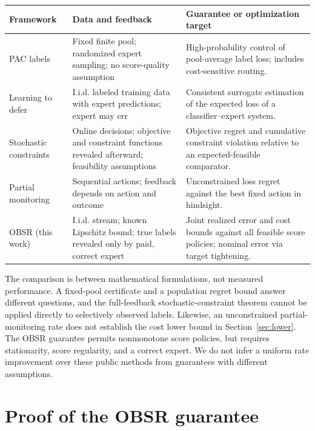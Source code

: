 \documentclass[11pt]{article}
\theoremstyle{remark}
\begin{document}
\begin{center}
\small
\setlength{\tabcolsep}{5pt}
\begin{tabular}{@{}>{\raggedright\arraybackslash}p{}
                  >{\raggedright\arraybackslash}p{}
                  >{\raggedright\arraybackslash}p{}@{}}
\toprule
Framework & Data and feedback & Guarantee or optimization target\\
\midrule
PAC labels~\cite{paclabels} & Fixed finite pool; randomized expert sampling;
no score-quality assumption & High-probability control of pool-average
label loss; includes cost-sensitive routing.\\[5pt]
Learning to defer~\cite{defer} & I.i.d. labeled training data with expert
predictions; expert may err & Consistent surrogate estimation of the
expected loss of a classifier--expert system.\\[5pt]
Stochastic constraints~\cite{stochastic} & Online decisions; objective and
constraint functions revealed afterward; feasibility assumptions &
Objective regret and cumulative constraint violation relative to an
expected-feasible comparator.\\[5pt]
Partial monitoring~\cite{partial} & Sequential actions; feedback depends
on action and outcome & Unconstrained loss regret against the best fixed
action in hindsight.\\[5pt]
OBSR (this work) & I.i.d. stream; known Lipschitz bound; true labels
revealed only by paid, correct expert & Joint realized error and cost bounds
against all feasible score policies; nominal error via target tightening.\\
\bottomrule
\end{tabular}
\end{center}
The comparison is between mathematical formulations, not measured
performance. A fixed-pool certificate and a population regret bound
answer different questions, and the full-feedback stochastic-constraint
theorem cannot be applied directly to selectively observed labels.
Likewise, an unconstrained partial-monitoring rate does not establish
the cost lower bound in Section~\ref{sec:lower}. The OBSR guarantee permits
nonmonotone score policies, but requires stationarity, score regularity,
and a correct expert. We do not infer a uniform rate improvement over
these public methods from guarantees with different assumptions.

\section{Proof of the OBSR guarantee}
\label{sec:upper-proof}
\end{document}
